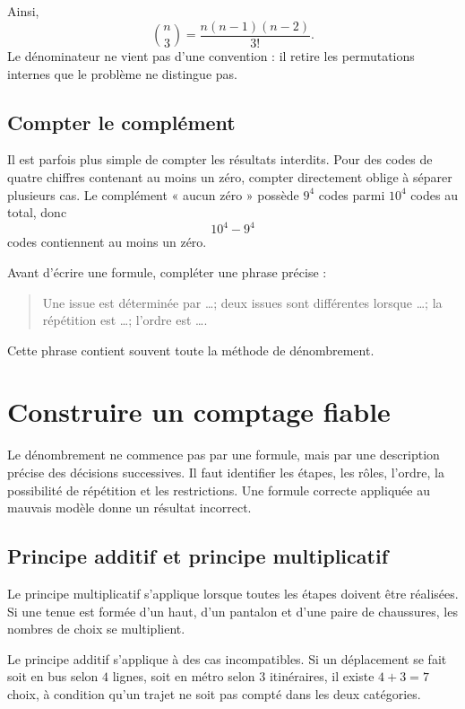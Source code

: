 \documentclass[12pt,a4paper,openany]{book}
\begin{document}
Ainsi,
\[
\binom n3=\frac{n(n-1)(n-2)}{3!}.
\]
Le dénominateur ne vient pas d'une convention : il retire les permutations internes que le problème ne distingue pas.

\subsection{Compter le complément}
Il est parfois plus simple de compter les résultats interdits. Pour des codes de quatre chiffres contenant au moins un zéro, compter directement oblige à séparer plusieurs cas. Le complément « aucun zéro » possède $9^4$ codes parmi $10^4$ codes au total, donc
\[
10^4-9^4
\]
codes contiennent au moins un zéro.

\begin{visualbox}
Avant d'écrire une formule, compléter une phrase précise :
\begin{quote}
Une issue est déterminée par \dots; deux issues sont différentes lorsque \dots; la répétition est \dots; l'ordre est \dots.
\end{quote}
Cette phrase contient souvent toute la méthode de dénombrement.
\end{visualbox}


\section{Construire un comptage fiable}

Le dénombrement ne commence pas par une formule, mais par une description précise des décisions successives. Il faut identifier les étapes, les rôles, l'ordre, la possibilité de répétition et les restrictions. Une formule correcte appliquée au mauvais modèle donne un résultat incorrect.

\subsection{Principe additif et principe multiplicatif}

Le principe multiplicatif s'applique lorsque toutes les étapes doivent être réalisées. Si une tenue est formée d'un haut, d'un pantalon et d'une paire de chaussures, les nombres de choix se multiplient.

Le principe additif s'applique à des cas incompatibles. Si un déplacement se fait soit en bus selon $4$ lignes, soit en métro selon $3$ itinéraires, il existe $4+3=7$ choix, à condition qu'un trajet ne soit pas compté dans les deux catégories.
\end{document}
